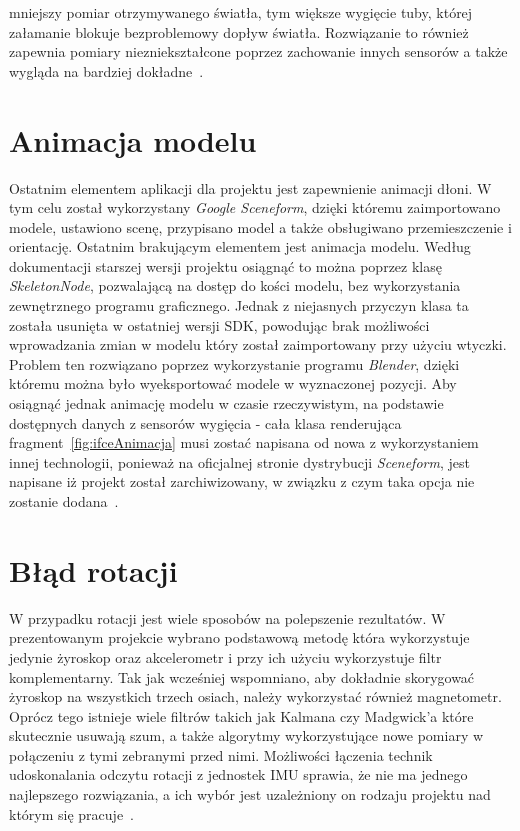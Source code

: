 mniejszy pomiar otrzymywanego światła, tym większe wygięcie tuby, której załamanie blokuje bezproblemowy dopływ światła. Rozwiązanie to również zapewnia pomiary niezniekształcone poprzez zachowanie innych sensorów a także wygląda na bardziej dokładne~\cite{ledsensor}.
 
 
  \section{Animacja modelu}
 \label{sec:iuAnimacja}
 Ostatnim elementem aplikacji dla projektu jest zapewnienie animacji dłoni. W tym celu został wykorzystany \textit{Google Sceneform}, dzięki któremu zaimportowano modele, ustawiono scenę, przypisano model a także obsługiwano przemieszczenie i orientację. Ostatnim brakującym elementem jest animacja modelu. Według dokumentacji starszej wersji projektu osiągnąć to można poprzez klasę \textit{SkeletonNode}, pozwalającą na dostęp do kości modelu, bez wykorzystania zewnętrznego programu graficznego. Jednak z niejasnych przyczyn klasa ta została usunięta w ostatniej wersji SDK, powodując brak możliwości wprowadzania zmian w modelu który został zaimportowany przy użyciu wtyczki. Problem ten rozwiązano poprzez wykorzystanie programu \textit{Blender}, dzięki któremu można było wyeksportować modele w wyznaczonej pozycji. Aby osiągnąć jednak animację modelu w czasie rzeczywistym, na podstawie dostępnych danych z sensorów wygięcia - cała klasa renderująca fragment~\ref{fig:ifceAnimacja} musi zostać napisana od nowa z wykorzystaniem innej technologii, ponieważ na oficjalnej stronie dystrybucji \textit{Sceneform}, jest napisane iż projekt został zarchiwizowany, w związku z czym taka opcja nie zostanie dodana~\cite{sceneform}. 
 
  \section{Błąd rotacji}
 \label{sec:iuRotacja}
 W przypadku rotacji jest wiele sposobów na polepszenie rezultatów. W prezentowanym projekcie wybrano podstawową metodę która wykorzystuje jedynie żyroskop oraz akcelerometr i przy ich użyciu wykorzystuje filtr komplementarny. Tak jak wcześniej wspomniano, aby dokładnie skorygować żyroskop na wszystkich trzech osiach, należy wykorzystać również magnetometr. Oprócz tego istnieje wiele filtrów takich jak Kalmana czy Madgwick'a które skutecznie usuwają szum, a także algorytmy wykorzystujące nowe pomiary w połączeniu z tymi zebranymi przed nimi. Możliwości łączenia technik udoskonalania odczytu rotacji z jednostek IMU sprawia, że nie ma jednego najlepszego rozwiązania, a ich wybór jest uzależniony on rodzaju projektu nad którym się pracuje~\cite{sensorslab}. 
 
